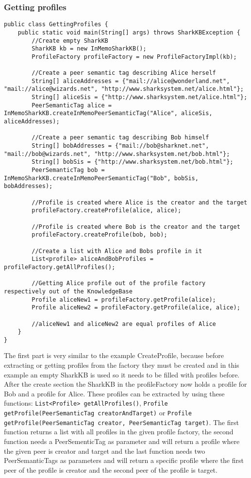 \subsubsection{Getting profiles}
\begin{verbatim}
public class GettingProfiles {
    public static void main(String[] args) throws SharkKBException {
    	//Create empty SharkKB
    	SharkKB kb = new InMemoSharkKB();
    	ProfileFactory profileFactory = new ProfileFactoryImpl(kb);
    	
    	//Create a peer semantic tag describing Alice herself
    	String[] aliceAddresses = {"mail://alice@wonderland.net", "mail://alice@wizards.net", "http://www.sharksystem.net/alice.html"};
    	String[] aliceSis = {"http://www.sharksystem.net/alice.html"};
    	PeerSemanticTag alice = InMemoSharkKB.createInMemoPeerSemanticTag("Alice", aliceSis, aliceAddresses);
    	
    	//Create a peer semantic tag describing Bob himself
    	String[] bobAddresses = {"mail://bob@sharknet.net", "mail://bob@wizards.net", "http://www.sharksystem.net/bob.html"};
    	String[] bobSis = {"http://www.sharksystem.net/bob.html"};
    	PeerSemanticTag bob = InMemoSharkKB.createInMemoPeerSemanticTag("Bob", bobSis, bobAddresses);
    	
    	//Profile is created where Alice is the creator and the target
    	profileFactory.createProfile(alice, alice);
    	
    	//Profile is created where Bob is the creator and the target
    	profileFactory.createProfile(bob, bob);
    	
    	//Create a list with Alice and Bobs profile in it
		List<profile> aliceAndBobProfiles = profileFactory.getAllProfiles();  	
		
		//Getting Alice profile out of the profile factory respectively out of the KnowledgeBase
		Profile aliceNew1 = profileFactory.getProfile(alice);
		Profile aliceNew2 = profileFactory.getProfile(alice, alice);
		
		//aliceNew1 and aliceNew2 are equal profiles of Alice
    }
}
\end{verbatim}

The first part is very similar to the example CreateProfile, because before extracting or getting profiles from the factory they must be created and in this example an empty SharkKB is used so it needs to be filled with profiles before. After the create section the SharkKB in the profileFactory now holds a profile for Bob and a profile for Alice. These profiles can be extracted by using these functions: {\tt List<Profile> getAllProfiles()}, {\tt Profile getProfile(PeerSemanticTag creatorAndTarget)} or {\tt Profile getProfile(PeerSemanticTag creator, PeerSemanticTag target)}. The first function returns a list with all profiles in the given profile factory, the second function needs a PeerSementicTag as parameter and will return a profile where the given peer is creator and target and the last function needs two PeerSemanticTags as parameters and will return a specific profile where the first peer of the profile is creator and the second peer of the profile is target.


